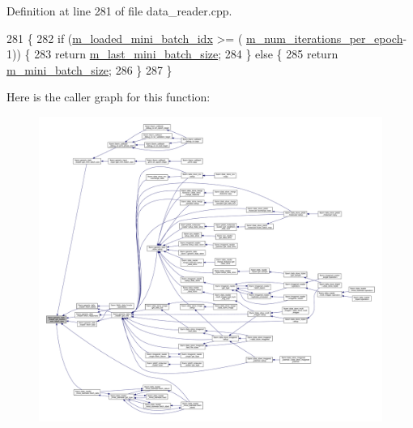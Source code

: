 Definition at line 281 of file data\+\_\+reader.\+cpp.


\begin{DoxyCode}
281                                                           \{
282   \textcolor{keywordflow}{if} (\hyperlink{classlbann_1_1generic__data__reader_a2cfc5a3e6de8a8a24d3525ec3ed586fb}{m\_loaded\_mini\_batch\_idx} >= (
      \hyperlink{classlbann_1_1generic__data__reader_ab570063483a1f604ca2fc536c3d83de7}{m\_num\_iterations\_per\_epoch}-1)) \{
283     \textcolor{keywordflow}{return} \hyperlink{classlbann_1_1generic__data__reader_a241f77b6209de4ae656bc34ad51bb612}{m\_last\_mini\_batch\_size};
284   \} \textcolor{keywordflow}{else} \{
285     \textcolor{keywordflow}{return} \hyperlink{classlbann_1_1generic__data__reader_a96f87a7d09711ab3eee3940ff2aa36ec}{m\_mini\_batch\_size};
286   \}
287 \}
\end{DoxyCode}
Here is the caller graph for this function\+:\nopagebreak
\begin{figure}[H]
\begin{center}
\leavevmode
\includegraphics[width=350pt]{classlbann_1_1generic__data__reader_a850e99110dd1e9df2985f09ea196fea8_icgraph}
\end{center}
\end{figure}
\mbox{\label{classlbann_1_1generic__data__reader_a92574413c82813cc50fbdfbb70b4065d}} 
